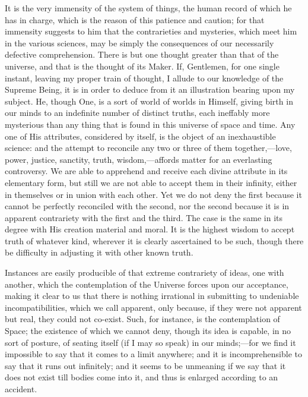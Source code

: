 It is the very immensity of the system of things, the human record
of which he has in charge, which is the reason of this patience and
caution; for that immensity suggests to him that the contrarieties and
mysteries, which meet him in the various sciences, may be simply the
consequences of our necessarily defective comprehension. There is but
one thought greater than that of the universe, and that is the thought
of its Maker. If, Gentlemen, for one single instant, leaving my proper
train of thought, I allude to our knowledge of the Supreme Being, it
is in order to deduce from it an illustration bearing upon my subject.
He, though One, is a sort of world of worlds in Himself, giving birth
in our minds to an indefinite number of distinct truths, each
ineffably more mysterious than any thing that is found in this
universe of space and time. Any one of His attributes, considered by
itself, is the object of an inexhaustible science: and the attempt to
reconcile any two or three of them together,—love, power, justice,
sanctity, truth, wisdom,—affords matter for an everlasting
controversy. We are able to apprehend and receive each divine
attribute in its elementary form, but still we are not able to accept
them in their infinity, either in themselves or in union with each
other. Yet we do not deny the first because it cannot be perfectly
reconciled with the second, nor the second because it is in apparent
contrariety with the first and the third. The case is the same in its
degree with His creation material and moral. It is the highest wisdom
to accept truth of whatever kind, wherever it is clearly ascertained
to be such, though there be difficulty in adjusting it with other
known truth.

Instances are easily producible of that extreme contrariety of
ideas, one with another, which the contemplation of the Universe
forces upon our acceptance, making it clear to us that there is
nothing irrational in submitting to undeniable incompatibilities,
which we call apparent, only because, if they were not apparent but
real, they could not co-exist. Such, for instance, is the
contemplation of Space; the existence of which we cannot deny, though
its idea is capable, in no sort of posture, of seating itself (if I
may so speak) in our minds;—for we find it impossible to say that it
comes to a limit anywhere; and it is incomprehensible to say that it
runs out infinitely; and it seems to be unmeaning if we say that it
does not exist till bodies come into it, and thus is enlarged
according to an accident.

